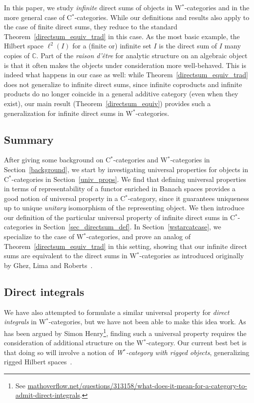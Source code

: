 \documentclass[reqno,T1,11pt]{amsproc}
\newcommand{\C}{\mathbb{C}}
\theoremstyle{plain}
\theoremstyle{remark}
\numberwithin{equation}{section}
\begin{document}
In this paper, we study \emph{infinite} direct sums of objects in W$^*$-categories and in the more general case of C$^*$-categories. While our definitions and results also apply to the case of finite direct sums, they reduce to the standard Theorem~\ref{directsum_equiv_trad} in this case. As the most basic example, the Hilbert space $\ell^2(I)$ for a (finite or) infinite set $I$ is the direct sum of $I$ many copies of $\C$. Part of the \emph{raison d'\^{e}tre} for analytic structure on an algebraic object is that it often makes the objects under consideration more well-behaved. This is indeed what happens in our case as well: while Theorem~\ref{directsum_equiv_trad} does not generalize to infinite direct sums, since infinite coproducts and infinite products do no longer coincide in a general additive category (even when they exist), our main result (Theorem~\ref{directsum_equiv}) provides such a generalization for infinite direct sums in W$^*$-categories.

\subsection*{Summary} After giving some background on C$^*$-categories and W$^*$-categories in Section~\ref{background}, we start by investigating universal properties for objects in C$^*$-categories in Section~\ref{univ_props}. We find that defining universal properties in terms of representability of a functor enriched in Banach spaces provides a good notion of universal property in a C$^*$-category, since it guarantees uniqueness up to unique \emph{unitary} isomorphism of the representing object. We then introduce our definition of the particular universal property of infinite direct sums in C$^*$-categories in Section~\ref{sec_directsum_def}. In Section~\ref{wstarcatcase}, we specialize to the case of W$^*$-categories, and prove an analog of Theorem~\ref{directsum_equiv_trad} in this setting, showing that our infinite direct sums are equivalent to the direct sums in W$^*$-categories as introduced originally by Ghez, Lima and Roberts~\cite{wstarcat}. 

\subsection*{Direct integrals} We have also attempted to formulate a similar universal property for \emph{direct integrals} in W$^*$-categories, but we have not been able to make this idea work. As has been argued by Simon Henry\footnote{See \href{https://mathoverflow.net/questions/313158/what-does-it-mean-for-a-category-to-admit-direct-integrals}{mathoverflow.net/questions/313158/what-does-it-mean-for-a-category-to-admit-direct-integrals}.}, finding such a universal property requires the consideration of additional structure on the W$^*$-category. Our current best bet is that doing so will involve a notion of \emph{W$^*$-category with rigged objects}, generalizing rigged Hilbert spaces~\cite{vol4}.
\end{document}
